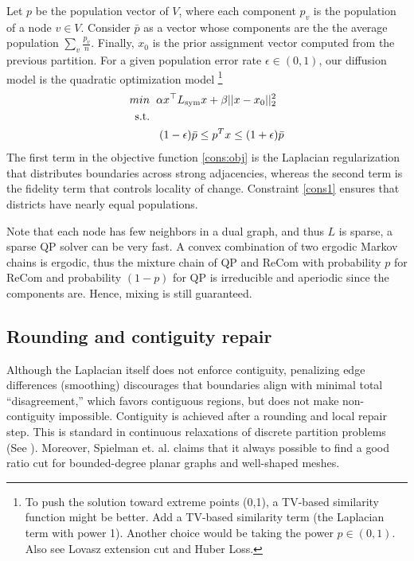 \documentclass[11pt]{article}
\begin{document}
Let $p$ be the population vector of $V$, where each component $p_v$ is the population of a node $v \in V$. Consider $\bar{p}$ as a vector whose components are the the average population $\sum_v \frac{p_v}{n}$. Finally, $x_0$ is the prior assignment vector computed from the previous partition. For a given population error rate $\epsilon \in (0,1)$, our diffusion model is the quadratic optimization model \footnote{To push the solution toward extreme points (0,1), a TV-based similarity function might be better. Add a TV-based similarity term (the Laplacian term with power 1). Another choice would be taking the power $p \in (0,1)$. Also see Lovasz extension cut \cite{chang2018lov} and Huber Loss.}
\begin{align}
min \hspace{2mm} & \alpha  x^\top L_{\mathrm{sym}} x + \beta ||x-x_0||_2^{2} \label{cons:obj} \\
 \text{s.t.}\hspace{2mm} & \nonumber\\
&\hspace{1mm} (1-\epsilon) \Bar{p} \leq p^T x \leq (1+ \epsilon) \Bar{p} \label{cons1}
\end{align}
The first term in the objective function \eqref{cons:obj} is the Laplacian regularization that distributes boundaries across strong adjacencies, whereas the second term is the fidelity term that controls locality of change. Constraint \eqref{cons1} ensures that districts have nearly equal populations.

Note that each node has few neighbors in a dual graph, and thus $L$ is sparse, a sparse QP solver can be very fast. A convex combination of two ergodic Markov chains is ergodic, thus the mixture chain of QP and ReCom with probability $p$ for ReCom and probability $(1-p)$ for QP is irreducible and aperiodic since the components are. Hence, mixing is still guaranteed. 

\subsection{Rounding and contiguity repair}\label{sec:rounding}

Although the Laplacian itself does not enforce contiguity, penalizing edge differences (smoothing) discourages that boundaries align with minimal total “disagreement,” which favors contiguous regions, but does not make non-contiguity impossible. Contiguity is achieved after a rounding and local repair step. This is standard in continuous relaxations of discrete partition problems (See \cite{trevisan2017lecture}). Moreover, Spielman et. al. \cite{spielman1996spectral} claims that it always possible to find a good ratio cut for bounded-degree planar graphs and well-shaped meshes.
\end{document}
